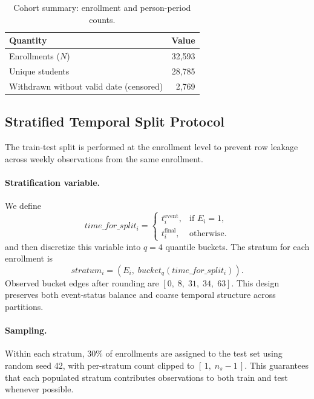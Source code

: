 \begin{table}[!t]
\centering
\caption{Cohort summary: enrollment and person-period counts.}
\label{tab:cohort_summary}
\begin{tabular}{lr}
\hline
Quantity & Value \\
\hline
Enrollments ($N$) & 32{,}593 \\
Unique students & 28{,}785 \\
Withdrawn without valid date (censored) & 2{,}769 \\
\hline
\end{tabular}
\end{table}

\subsection{Stratified Temporal Split Protocol}
\label{subsec:split}

The train-test split is performed at the enrollment level to prevent row leakage across weekly observations from the same enrollment.

\paragraph*{Stratification variable.}
We define
\begin{equation*}
time\_for\_split_i =
\begin{cases}
t_i^{\mathrm{event}}, & \text{if } E_i = 1,\\
t_i^{\mathrm{final}}, & \text{otherwise.}
\end{cases}
\end{equation*}
and then discretize this variable into $q=4$ quantile buckets. The stratum for each enrollment is
\begin{equation*}
stratum_i = (E_i,\; bucket_q(time\_for\_split_i)).
\end{equation*}
Observed bucket edges after rounding are $[0,\;8,\;31,\;34,\;63]$. This design preserves both event-status balance and coarse temporal structure across partitions.

\paragraph*{Sampling.}
Within each stratum, $30\%$ of enrollments are assigned to the test set using random seed 42, with per-stratum count clipped to $[\,1,\; n_s-1\,]$. This guarantees that each populated stratum contributes observations to both train and test whenever possible.

